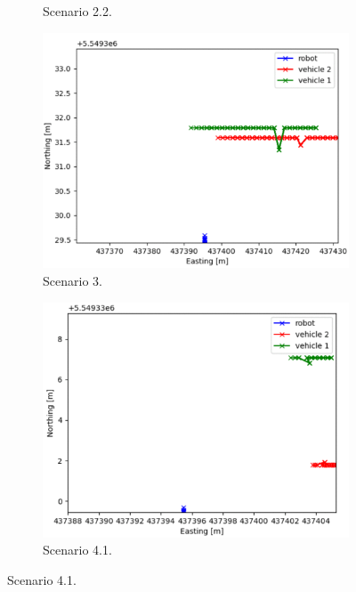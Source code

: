 \begin{figure}[H]
\begin{subfigure}{0.49\linewidth}
                \caption{Scenario 2.2.}
            \end{subfigure}
            \begin{subfigure}{0.49\linewidth}
                \centering
                \includegraphics[width=\linewidth]{images/simulations/start_3.png}
                \caption{Scenario 3.}
            \end{subfigure}
            \begin{subfigure}{0.49\linewidth}
                \centering
                \includegraphics[width=\linewidth]{images/simulations/start_4_1.png}
                \caption{Scenario 4.1.}
            \end{subfigure}

\end{figure}
